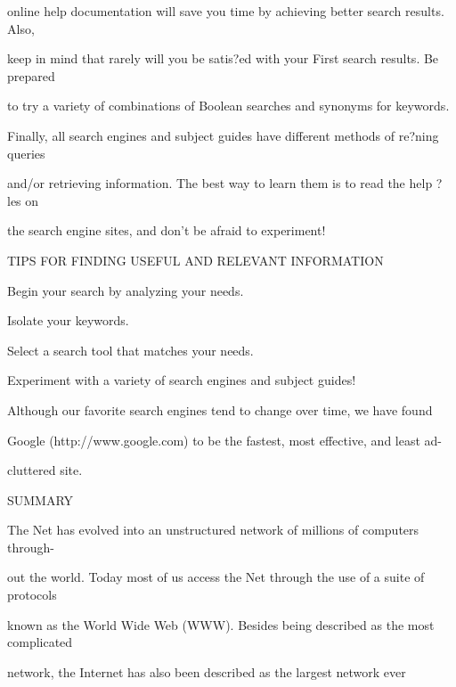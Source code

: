 \documentclass{book}
\begin{document}
\begin{flushleft}
\noindent online help documentation will save you time by achieving better search results. Also,

\noindent keep in mind that rarely will you be satis?ed with your First search results. Be prepared

\noindent to try a variety of combinations of Boolean searches and synonyms for keywords.

\noindent Finally, all search engines and subject guides have different methods of re?ning queries

\noindent and/or retrieving information. The best way to learn them is to read the help ?les on

\noindent the search engine sites, and don't be afraid to experiment!

\noindent 

\noindent TIPS FOR FINDING USEFUL AND RELEVANT INFORMATION

\noindent 

\noindent 

\noindent Begin your search by analyzing your needs.

\noindent Isolate your keywords.

\noindent Select a search tool that matches your needs.

\noindent Experiment with a variety of search engines and subject guides! 

\noindent Although our favorite search engines tend to change over time, we have found

\noindent Google (http://www.google.com) to be the fastest, most effective, and least ad-

\noindent cluttered site.

\noindent 

\noindent 

\noindent SUMMARY

\noindent 

\noindent The Net has evolved into an unstructured network of millions of computers through-

\noindent out the world. Today most of us access the Net through the use of a suite of protocols

\noindent known as the World Wide Web (WWW). Besides being described as the most complicated

\noindent  network, the Internet has also been described as the largest network ever

\noindent 
\end{flushleft}
\end{document}
